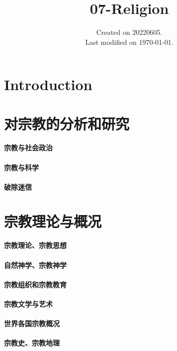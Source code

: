 \documentclass[UTF8]{../RepresentationUniverse}
\begin{document}
\title{07-Religion}
\date{Created on 20220605.\\   Last modified on \today.}
\maketitle
\tableofcontents


\chapter{Introduction}

\chapter{对宗教的分析和研究}
\subsubsection{宗教与社会政治}
\subsubsection{宗教与科学}
\subsubsection{破除迷信}

\chapter{宗教理论与概况}
\subsubsection{宗教理论、宗教思想}
\subsubsection{自然神学、宗教神学}
\subsubsection{宗教组织和宗教教育}
\subsubsection{宗教文学与艺术}
\subsubsection{世界各国宗教概况}
\subsubsection{宗教史、宗教地理}
\end{document}

